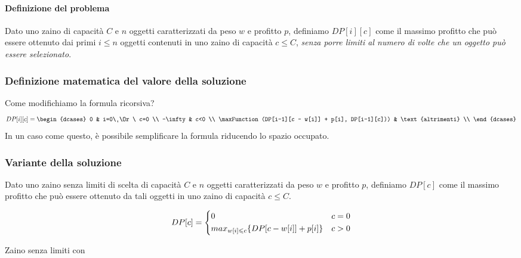 \paragraph{Definizione del problema}
Dato uno zaino di capacità \(C\) e \(n\) oggetti caratterizzati da peso \(w\) e profitto \(p\), definiamo \(DP[i][c]\) come il massimo profitto che può essere ottenuto dai primi \(i \leqslant n\) oggetti contenuti in uno zaino di capacità \(c \leqslant C\), \emph{senza porre limiti al numero di volte che un oggetto può essere selezionato}.

\subsubsection{Definizione matematica del valore della soluzione}

Come modifichiamo la formula ricorsiva?
\[
    DP[i][c] =
    \begin{dcases}
        0                                                   & i=0\ \Or\ c=0     \\
        -\infty                                             & c<0               \\
        \maxFunction(DP[i-1][c - w[i]] + p[i], DP[i-1][c])) & \text{altrimenti} \\
    \end{dcases}
\]
In un caso come questo, è possibile semplificare la formula riducendo lo spazio occupato.

\subsubsection{Variante della soluzione}

Dato uno zaino senza limiti di scelta di capacità \(C\) e \(n\) oggetti caratterizzati da peso \(w\) e profitto \(p\), definiamo \(DP[c]\) come il massimo profitto che può essere ottenuto da tali oggetti in uno zaino di capacità \(c \leqslant C\).

\[
    DP[c] =
    \begin{dcases}
    0                                           & c = 0 \\
    max_{w[i] \leqslant c}\{DP[c-w[i]] + p[i]\} & c > 0 \\
    \end{dcases}
\]

\begin{algorithm}[H]
    \caption{Zaino senza limiti con }
    
\end{algorithm}

